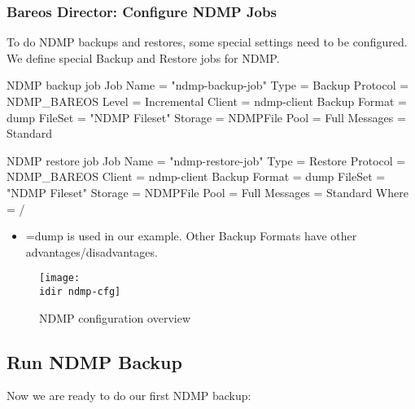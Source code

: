 \subsubsection{Bareos Director: Configure NDMP Jobs}

To do NDMP backups and restores, some special settings need to be configured. We define special Backup and Restore jobs for NDMP.

\begin{bconfig}{NDMP backup job}
Job {
  Name          = "ndmp-backup-job"
  Type          = Backup
  Protocol      = NDMP_BAREOS
  Level         = Incremental
  Client        = ndmp-client
  Backup Format = dump
  FileSet       = "NDMP Fileset"
  Storage       = NDMPFile
  Pool          = Full
  Messages      = Standard
}
\end{bconfig}

\begin{bconfig}{NDMP restore job}
Job {
  Name          = "ndmp-restore-job"
  Type          = Restore
  Protocol      = NDMP_BAREOS
  Client        = ndmp-client
  Backup Format = dump
  FileSet       = "NDMP Fileset"
  Storage       = NDMPFile
  Pool          = Full
  Messages      = Standard
  Where         = /
}
\end{bconfig}

\begin{itemize}
    \item {}=dump is used in our example. Other Backup Formats have other advantages/disadvantages.
\end{itemize}


\begin{figure}[htbp]
\centering
\texttt{[image: \\idir ndmp-cfg]}
\caption{NDMP configuration overview}
\label{fig:ndmp-overview}
\end{figure}%


\subsection{Run NDMP Backup}

Now we are ready to do our first NDMP backup:

